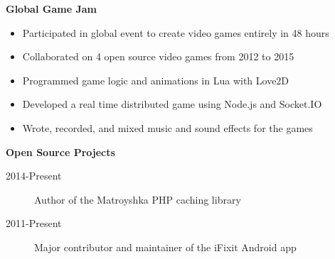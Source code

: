 \documentclass[letterpaper,11pt]{article}
\newcommand{\resitem}[1]{\item #1 \vspace{-2pt}}
\newcommand{\resheading}[1]{{\large \colorbox{mygrey}{\begin{minipage}{\textwidth}{\textbf{#1 \vphantom{p\^{E}}}}\end{minipage}}}}
\begin{document}
\resheading{Global Game Jam}

\begin{itemize}
   \resitem{Participated in global event to create video games entirely in 48 hours}
   \resitem{Collaborated on 4 open source video games from 2012 to 2015}
   \resitem{Programmed game logic and animations in Lua with Love2D}
   \resitem{Developed a real time distributed game using Node.js and Socket.IO}
   \resitem{Wrote, recorded, and mixed music and sound effects for the games}
\end{itemize}

\resheading{Open Source Projects}

\begin{description}
\item[2014-Present] Author of the Matroyshka PHP caching library
\item[2011-Present] Major contributor and maintainer of the iFixit Android app
\end{description}
\end{document}
